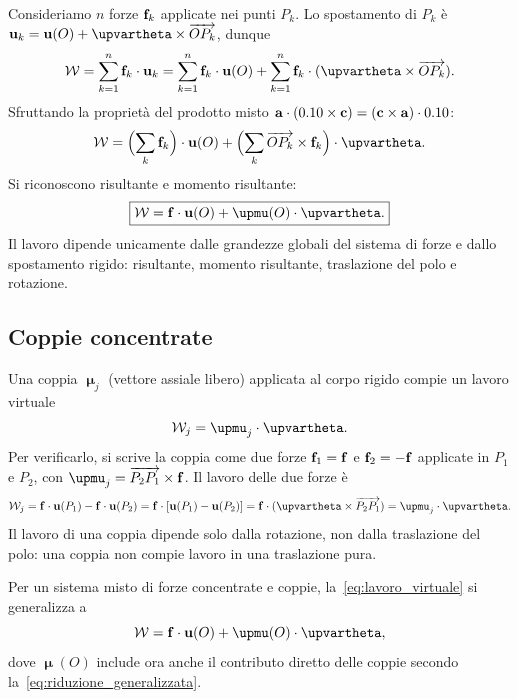 Consideriamo $n$ forze $\mathbf{f}_k$ applicate nei punti $P_k$.
Lo spostamento di $P_k$ è
$\ub_k = \ub(O) + \bm{\upvartheta} \times
\overrightarrow{OP_k}$, dunque
\begin{equation}
	\Wc = \sum_{k=1}^{n} \fb_k \cdot \ub_k
	= \sum_{k=1}^{n} \fb_k \cdot \ub(O)
	+ \sum_{k=1}^{n} \fb_k \cdot
	(\bm{\upvartheta} \times \overrightarrow{OP_k}).
\end{equation}
Sfruttando la proprietà del prodotto misto
$\mathbf{a} \cdot (0.10 \times \mathbf{c}) = (\mathbf{c} \times \mathbf{a}) \cdot 0.10$:
\begin{equation}
	\Wc = \Bigl(\sum_k \fb_k\Bigr) \cdot \ub(O)
	+ \Bigl(\sum_k \overrightarrow{OP_k}
	\times \fb_k\Bigr) \cdot \bm{\upvartheta}.
\end{equation}
Si riconoscono risultante e momento risultante:
\begin{equation}\label{eq:lavoro_virtuale}
	\boxed{\Wc = \fb \cdot \ub(O)
		+ \bm{\upmu}(O) \cdot \bm{\upvartheta}.}
\end{equation}
Il lavoro dipende unicamente dalle grandezze globali del
sistema di forze e dallo spostamento rigido: risultante,
momento risultante, traslazione del polo e rotazione.

\subsection{Coppie concentrate}

Una coppia $\bm{\upmu}_j$ (vettore assiale libero) applicata
al corpo rigido compie un lavoro virtuale
\begin{equation}
	\Wc_j = \bm{\upmu}_j \cdot \bm{\upvartheta}.
\end{equation}
Per verificarlo, si scrive la coppia come due forze
$\mathbf{f}_1 = \mathbf{f}$ e $\mathbf{f}_2 = -\mathbf{f}$ applicate in $P_1$ e $P_2$,
con $\bm{\upmu}_j = \overrightarrow{P_2P_1} \times \fb$.
Il lavoro delle due forze è
\begin{equation}
	\Wc_j = \fb \cdot \ub(P_1) - \fb \cdot \ub(P_2)
	= \fb \cdot [\ub(P_1) - \ub(P_2)]
	= \fb \cdot (\bm{\upvartheta} \times
	\overrightarrow{P_2P_1})
	= \bm{\upmu}_j \cdot \bm{\upvartheta}.
\end{equation}
Il lavoro di una coppia dipende solo dalla rotazione, non
dalla traslazione del polo: una coppia non compie lavoro
in una traslazione pura.

Per un sistema misto di forze concentrate e coppie,
la~\eqref{eq:lavoro_virtuale} si generalizza a
\begin{equation}\label{eq:lavoro_misto}
	\Wc = \fb \cdot \ub(O)
	+ \bm{\upmu}(O) \cdot \bm{\upvartheta},
\end{equation}
dove $\bm{\upmu}(O)$ include ora anche il contributo
diretto delle coppie secondo la~\eqref{eq:riduzione_generalizzata}.


